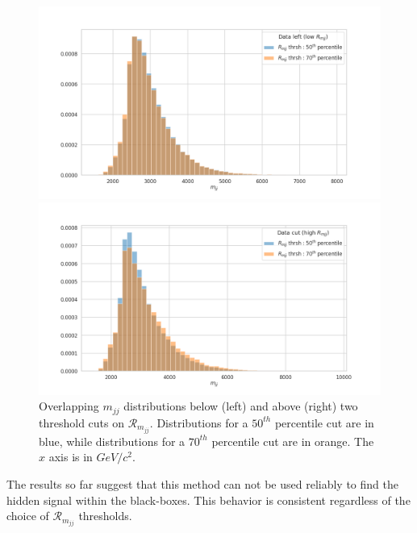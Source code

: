 \documentclass[letterpaper,11pt]{article}
\begin{document}
\begin{figure}[h!]
    \centering
    \begin{minipage}[b]{.5\textwidth}
        \centering
        \includegraphics[width=\textwidth]{img/LLR_right.png}
    \end{minipage}%
    \begin{minipage}[b]{.5\textwidth}
        \centering
        \includegraphics[width=\textwidth]{img/LLR_left.png}
    \end{minipage}
    \label{fig:fig3}
    \caption{Overlapping $m_{jj}$ distributions below (left) and above (right) two threshold cuts on $\mathcal{R}_{m_{jj}}$. Distributions for a $50^{th}$ percentile cut are in blue, while  distributions for a $70^{th}$ percentile cut are in orange. The $x$ axis is in $GeV/c^2$.}
\end{figure}

The results so far suggest that this method can not be used reliably to find the hidden signal within the black-boxes. This behavior is consistent regardless of the choice of $\mathcal{R}_{m_{jj}}$ thresholds.
\end{document}
